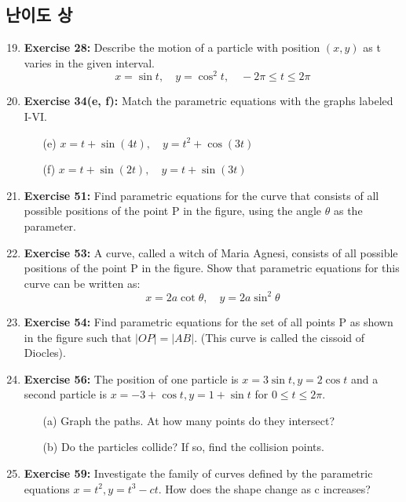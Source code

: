 \documentclass[12pt, a4paper]{article}
\begin{document}
\subsection*{난이도 상 }
\begin{enumerate}
    \setcounter{enumi}{18} %
    \item \textbf{Exercise 28:} Describe the motion of a particle with position $(x,y)$ as t varies in the given interval.
    \[ x = \sin t, \quad y = \cos^2 t, \quad -2\pi \le t \le 2\pi \]

    \item \textbf{Exercise 34(e, f):} Match the parametric equations with the graphs labeled I-VI.
    \begin{itemize}
        \item[(e)] $x = t + \sin(4t), \quad y = t^2 + \cos(3t)$
        \item[(f)] $x = t + \sin(2t), \quad y = t + \sin(3t)$
    \end{itemize}

    \item \textbf{Exercise 51:} Find parametric equations for the curve that consists of all possible positions of the point P in the figure, using the angle $\theta$ as the parameter.
    
    \item \textbf{Exercise 53:} A curve, called a witch of Maria Agnesi, consists of all possible positions of the point P in the figure. Show that parametric equations for this curve can be written as:
    \[ x = 2a\cot\theta, \quad y = 2a\sin^2\theta \]

    \item \textbf{Exercise 54:} Find parametric equations for the set of all points P as shown in the figure such that $|OP| = |AB|$. (This curve is called the cissoid of Diocles).

    \item \textbf{Exercise 56:} The position of one particle is $x=3\sin t, y=2\cos t$ and a second particle is $x=-3+\cos t, y=1+\sin t$ for $0 \le t \le 2\pi$.
    \begin{itemize}
        \item[(a)] Graph the paths. At how many points do they intersect?
        \item[(b)] Do the particles collide? If so, find the collision points.
    \end{itemize}

    \item \textbf{Exercise 59:} Investigate the family of curves defined by the parametric equations $x=t^2, y=t^3-ct$. How does the shape change as c increases?
\end{enumerate}
\end{document}

